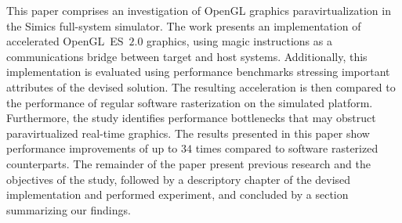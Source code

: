 This paper comprises an investigation of OpenGL graphics paravirtualization in the Simics full-system simulator.
The work presents an implementation of accelerated OpenGL~ES~$2.0$ graphics, using magic instructions as a communications bridge between target and host systems.
Additionally, this implementation is evaluated using performance benchmarks stressing important attributes of the devised solution.
The resulting acceleration is then compared to the performance of regular software rasterization on the simulated platform.
Furthermore, the study identifies performance bottlenecks that may obstruct paravirtualized real-time graphics.
The results presented in this paper show performance improvements of up to $34$ times compared to software rasterized counterparts.
The remainder of the paper present previous research and the objectives of the study, followed by a descriptory chapter of the devised implementation and performed experiment, and concluded by a section summarizing our findings.


